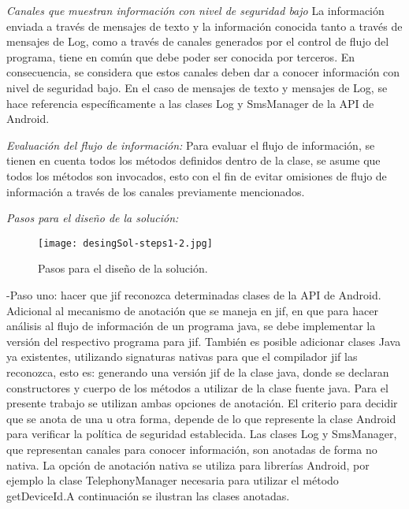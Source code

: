 \textit{Canales que muestran información con nivel de seguridad bajo}\newline
La información enviada a través de mensajes de texto y la información conocida
tanto a través de mensajes de Log, como a través de canales generados por el
control de flujo del programa, tiene en común que debe poder ser conocida por
terceros. En consecuencia, se considera que estos canales deben dar a conocer
información con nivel de seguridad bajo.\newline
En el caso de mensajes de texto y mensajes de Log, se hace referencia
específicamente a las clases Log y SmsManager de la API de Android.\newline

\textit{Evaluación del flujo de información:}\newline
Para evaluar el flujo de información, se tienen en cuenta todos los métodos
definidos dentro de la clase, se asume que todos los métodos son invocados, esto
con el fin de evitar omisiones de flujo de información a través de los canales
previamente mencionados.


\textit{Pasos para el diseño de la solución:}\newline

\begin{figure}[h!]
	\begin{center}
	\texttt{[image: desingSol-steps1-2.jpg]}
	\end{center}
	\caption{Pasos para el diseño de la solución.}
	\label{fig:desingSol-steps1-2}
\end{figure}

-Paso uno: hacer que jif reconozca determinadas clases de la API de
Android.\newline 
Adicional al mecanismo de anotación que se maneja en jif, en que para hacer
análisis al flujo de información de un programa java, se debe implementar la
versión del respectivo programa para jif. También es posible adicionar clases
Java ya existentes, utilizando signaturas nativas para que el compilador jif las
reconozca, esto es: generando una versión jif de la clase java, donde se
declaran constructores y cuerpo de los métodos a utilizar de la clase fuente
java.\newline
Para el presente trabajo se utilizan ambas opciones de anotación. El criterio
para decidir que se anota de una u otra forma, depende de lo que represente la
clase Android para verificar la política de seguridad establecida. Las clases
Log y SmsManager, que representan canales para conocer información, son anotadas
de forma no nativa. La opción de anotación nativa se utiliza para librerías
Android, por ejemplo la clase TelephonyManager necesaria para utilizar el método
getDeviceId.\newline A continuación se ilustran las clases anotadas.

